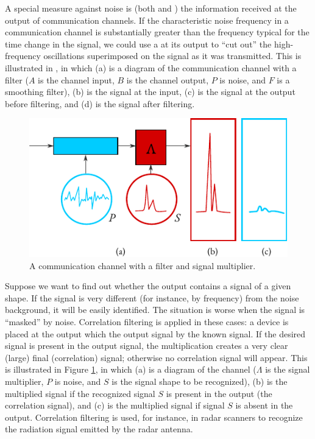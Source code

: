 A special measure against noise is  (both  and
) the information received at the output of communication
channels. If the characteristic noise frequency in a communication
channel is substantially greater than the frequency typical for the time
change in the signal, we could use a  at its output to ``cut out'' the high-frequency oscillations superimposed on the signal as it was
transmitted. This is illustrated in , in which (a) is a diagram of the communication channel with a filter ($A$ is the channel input, $B$ is the
channel output, $P$ is noise, and $F$ is a smoothing filter), (b) is the signal at the input, (c) is the signal at the output before filtering, and (d) is the signal after filtering.
\begin{figure}[!ht]
 \centering
 \includegraphics[width=0.8\tfwidth]{figures/noise2.pdf}
\caption{A communication channel with a filter and signal multiplier.\label{noise2}}
 \end{figure}
 
Suppose we want to find out whether the output contains a signal of
a given shape. If the signal is very different (for instance, by frequency)
from the noise background, it will be easily identified. The situation is
worse when the signal is ``masked'' by noise. Correlation filtering is
applied in these cases: a device is placed at the output which 
the output signal by the known signal. If the desired signal is present in
the output signal, the multiplication creates a very clear (large) final
(correlation) signal; otherwise no correlation signal will appear. This is
illustrated in Figure \ref{noise2}, in which (a) is a diagram of the channel ($\Lambda$ is the signal multiplier, $P$ is noise, and $S$ is the signal shape to be recognized), (b) is the multiplied signal if the recognized signal $S$ is present in the output (the correlation signal), and (c) is the multiplied signal if signal $S$ is absent in the output. Correlation filtering is used, for instance, in radar scanners to recognize the radiation signal emitted by the radar antenna.

